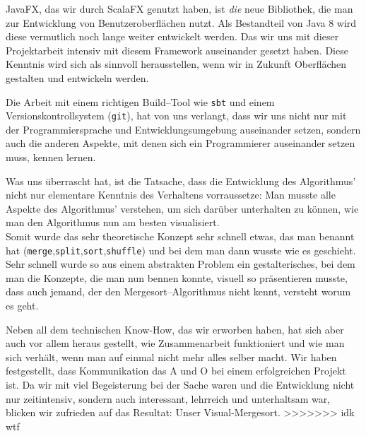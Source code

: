 JavaFX, das wir durch ScalaFX genutzt haben, ist \textit{die} neue Bibliothek, die man zur Entwicklung von Benutzeroberflächen nutzt. Als Bestandteil von Java 8 wird diese vermutlich noch lange weiter entwickelt werden. Das wir uns mit dieser Projektarbeit intensiv mit diesem Framework auseinander gesetzt haben. Diese Kenntnis wird sich als sinnvoll herausstellen, wenn wir in Zukunft Oberflächen gestalten und entwickeln werden.

Die Arbeit mit einem richtigen Build--Tool wie \texttt{sbt} und einem Versionskontrollsystem (\texttt{git}), hat von uns verlangt, dass wir uns nicht nur mit der Programmiersprache und Entwicklungsumgebung auseinander setzen, sondern auch die anderen Aspekte, mit denen sich ein Programmierer auseinander setzen muss, kennen lernen.

Was uns überrascht hat, ist die Tatsache, dass die Entwicklung des Algorithmus' nicht nur elementare Kenntnis des Verhaltens vorraussetze: Man musste alle Aspekte des Algorithmus' verstehen, um sich darüber unterhalten zu können, wie man den Algorithmus nun am besten visualisiert.\\
Somit wurde das sehr theoretische Konzept sehr schnell etwas, das man benannt hat (\texttt{merge},\texttt{split},\texttt{sort},\texttt{shuffle}) und bei dem man dann wusste wie es geschieht. Sehr schnell wurde so aus einem abstrakten Problem ein gestalterisches, bei dem man die Konzepte, die man nun bennen konnte, visuell so präsentieren musste, dass auch jemand, der den Mergesort--Algorithmus nicht kennt, versteht worum es geht.

Neben all dem technischen Know-How, das wir erworben haben, hat sich aber auch vor allem heraus gestellt, wie Zusammenarbeit funktioniert und wie man sich verhält, wenn man auf einmal nicht mehr alles selber macht. Wir haben festgestellt, dass Kommunikation das A und O bei einem erfolgreichen Projekt ist. Da wir mit viel Begeisterung bei der Sache waren und die Entwicklung nicht nur zeitintensiv, sondern auch interessant, lehrreich und unterhaltsam war, blicken wir zufrieden auf das Resultat: Unser Visual-Mergesort.
>>>>>>> idk wtf
